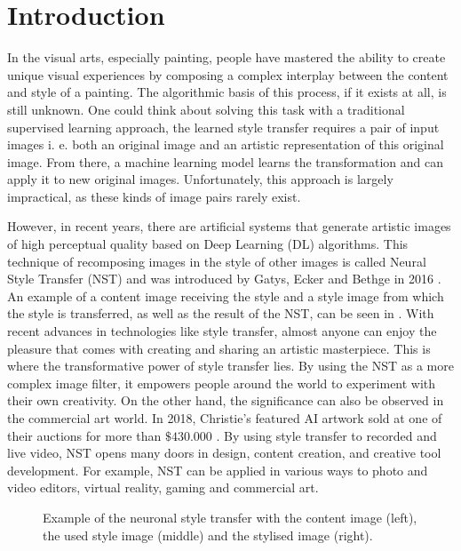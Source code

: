 \section{Introduction}

In the visual arts, especially painting, people have mastered the ability to create unique visual experiences by composing a complex interplay between the content and style of a painting. The algorithmic basis of this process, if it exists at all, is still unknown. One could think about solving this task with a traditional supervised learning approach, the learned style transfer requires a pair of input images i. e. both an original image and an artistic representation of this original image. From there, a machine learning model learns the transformation and can apply it to new original images. Unfortunately, this approach is largely impractical, as these kinds of image pairs rarely exist.
 
However, in recent years, there are artificial systems that generate artistic images of high perceptual quality based on Deep Learning (DL) algorithms. This technique of recomposing images in the style of other images is called Neural Style Transfer (NST) and was introduced by Gatys, Ecker and Bethge in 2016 \cite{GEB2016}. An example of a content image receiving the style and a style image from which the style is transferred, as well as the result of the NST, can be seen in . With recent advances in technologies like style transfer, almost anyone can enjoy the pleasure that comes with creating and sharing an artistic masterpiece. This is where the transformative power of style transfer lies. By using the NST as a more complex image filter, it empowers people around the world to experiment with their own creativity. On the other hand, the significance can also be observed in the commercial art world. In 2018, Christie's featured AI artwork sold at one of their auctions for more than $\$430.000$ \cite{2018}. By using style transfer to recorded and live video, NST opens many doors in design, content creation, and creative tool development. For example, NST can be applied in various ways to photo and video editors, virtual reality, gaming and commercial art.
     
\begin{figure*}[!t]
	\centering
	
	\caption{Example of the neuronal style transfer with the content image (left), the used style image (middle) and the stylised image (right).}
	\label{fig_nst}
\end{figure*}

